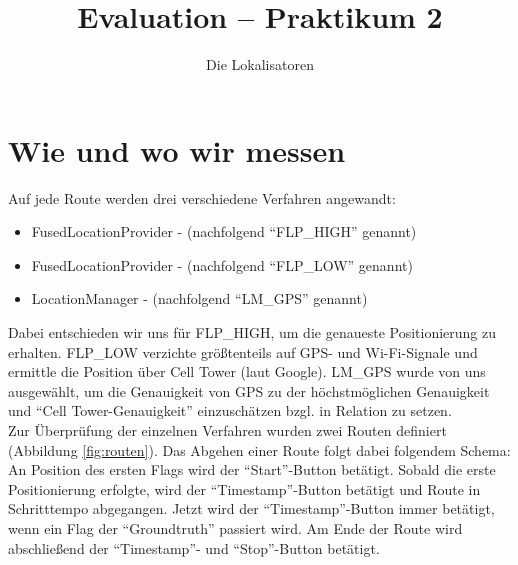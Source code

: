 

\title{Evaluation -- Praktikum 2}
\author{Die Lokalisatoren}

\ihead{}
\chead{}
\ohead{}
\ifoot{}
\cfoot{\pagemark}
\ofoot{}



\setlength{\parskip}{0em}
\setlength{\parindent}{0em}
\renewcommand{\baselinestretch}{1.5}



\docheader

\section{Wie und wo wir messen}

Auf jede Route werden drei verschiedene Verfahren angewandt: 
\begin{itemize}
	\item FusedLocationProvider -  (nachfolgend "`FLP\_HIGH"' genannt)
	\item FusedLocationProvider -  (nachfolgend "`FLP\_LOW"' genannt)
	\item LocationManager -  (nachfolgend "`LM\_GPS"' genannt)
\end{itemize}

Dabei entschieden wir uns für FLP\_HIGH, um die genaueste Positionierung zu erhalten. FLP\_LOW verzichte größtenteils auf GPS- und Wi-Fi-Signale und ermittle die Position über Cell Tower (laut Google). LM\_GPS wurde von uns ausgewählt, um die Genauigkeit von GPS zu der höchstmöglichen Genauigkeit und "`Cell Tower-Genauigkeit"' einzuschätzen bzgl. in Relation zu setzen. \\

Zur Überprüfung der einzelnen Verfahren wurden zwei Routen definiert (Abbildung \ref{fig:routen}). Das Abgehen einer Route folgt dabei folgendem Schema: An Position des ersten Flags wird der "`Start"'-Button betätigt. Sobald die erste Positionierung erfolgte, wird der "`Timestamp"'-Button betätigt und Route in Schritttempo abgegangen. Jetzt wird der "`Timestamp"'-Button immer betätigt, wenn ein Flag der "`Groundtruth"' passiert wird. Am Ende der Route wird abschließend der "`Timestamp"'- und "`Stop"'-Button betätigt.

